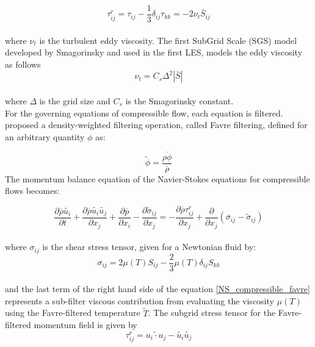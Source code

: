 \documentclass[a5paper]{sapthesis}
\begin{document}
	\begin{equation}
		\tau_{ij}^r = \tau_{ij} - \frac{1}{3}\delta_{ij}\tau_{kk} = -2 \nu_t \bar{S}_{ij}
	\end{equation}
	\\
	where $\nu_t$ is the turbulent eddy viscosity. The first SubGrid Scale (SGS) model developed by Smagorinsky and used in the first LES,  models the eddy viscosity as follows
	\begin{equation}
		\nu_t = C_s \Delta^2|\bar{S}|
	\end{equation}
	\\
	where $\Delta$ is the grid size and $C_s$ is the Smagorinsky constant.
	\\
	For the governing equations of compressible flow, each equation is filtered.
	\citet{Favre} proposed a density-weighted filtering operation, called Favre filtering, defined for an arbitrary quantity $\phi$ as:
	
	\begin{equation}
		\tilde {\phi }=\frac {\overline {\rho \phi }}{\overline {\rho }}
	\end{equation}
	The momentum balance equation of the Navier-Stokes equations for compressible flows becomes:
	
	\begin{equation}
		{\frac {\partial {\overline {\rho }}{\tilde {u_{i}}}}{\partial t}}+{\frac {\partial {\overline {\rho }}{\tilde {u_{i}}}{\tilde {u_{j}}}}{\partial x_{j}}}+{\frac {\partial {\overline {p}}}{\partial x_{i}}}-{\frac {\partial {\tilde {\sigma }}_{ij}}{\partial x_{j}}}=-{\frac {\partial {\overline {\rho }}\tau _{ij}^{r}}{\partial x_{j}}}+{\frac {\partial }{\partial x_{j}}}\left({\overline {\sigma }}_{ij}-{\tilde {\sigma }}_{ij}\right)
		\label{NS_compressible_favre}
	\end{equation}
	\\
	where $\sigma _{ij}$ is the shear stress tensor, given for a Newtonian fluid by: 
	\begin{equation}
		\sigma _{ij}=2\mu (T)S_{ij}-{\frac {2}{3}}\mu (T)\delta _{ij}S_{kk}
	\end{equation}
	\\
	and the last term of the right hand side of the equation \ref{NS_compressible_favre} represents a sub-filter viscous contribution from evaluating the viscosity $\mu (T)$ using the Favre-filtered temperature $\tilde {T}$. The subgrid stress tensor for the Favre-filtered momentum field is given by 
	\begin{equation}
			\tau _{ij}^{r}={\widetilde {u_{i}\cdot u_{j}}}-{\tilde {u_{i}}}{\tilde {u_{j}}}
	\end{equation}
\end{document}
